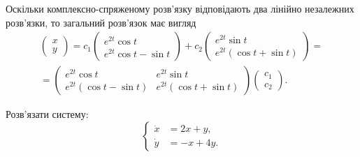 \begin{solution}
    Оскільки комплексно-спряженому розв'язку відповідають два лінійно незалежних розв'язки, то загальний розв'язок має вигляд
    \begin{multline*} \begin{pmatrix} x \\ y \end{pmatrix} = c_1 \begin{pmatrix} e^{2 t} \cos t \\ e^{2 t} \cos t - \sin t \end{pmatrix} + c_2 \begin{pmatrix} e^{2 t} \sin t \\ e^{2 t} (\cos t + \sin t) \end{pmatrix} = \\ = \begin{pmatrix} e^{2 t} \cos t & e^{2 t} \sin t \\ e^{2 t} (\cos t - \sin t) & e^{2 t} (\cos t + \sin t) \end{pmatrix} \begin{pmatrix} c_1 \\ c_2 \end{pmatrix}. \end{multline*}
\end{solution}

\begin{example}
    Розв'язати систему:
    \[ \left\{ \begin{aligned}
        \dot x &= 2 x + y, \\
        \dot y &= -x + 4 y.
    \end{aligned} \right. \]
\end{example}
 
